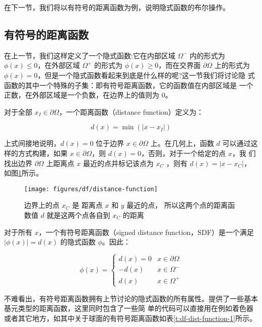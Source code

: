 在下一节，我们将以有符号的距离函数为例，说明隐式函数的布尔操作。



\subsection{有符号的距离函数}
在上一节，我们这样定义了一个隐式函数:它在内部区域 $\Omega^{−}$ 内的形式为 $\phi({x}) \leq 0$，在外部区域 $\Omega^{+}$ 的形式为 $\phi({x}) \geq 0$，而在交界面 $\partial\Omega$ 上的形式为 $\phi({x}) = 0$，但是一个隐式函数看起来到底是什么样的呢?这一节我们将讨论隐 式函数的其中一个特殊的子集：即有符号距离函数，它的函数值在内部区域是 一个正数，在外部区域是一个负数，在边界上的值则为 0。

对于全部 ${x}_I \in\partial\Omega$，一个距离函数（distance function）定义为：

\begin{equation}
	d({x})=\min (|{x}-{x}_I|)
\end{equation}

上式间接地说明，$d({x}) = 0$ 位于边界 ${x}\in\partial\Omega$ 上。在几何上，函数 $d$ 可以通过这样的方式构建，如果 ${x}\in \partial\Omega$，则 $d({x}) = 0$，否则，对于一个给定的点 ${x}$，我 们找出边界 $\partial\Omega$ 上距离点 ${x}$ 最近的点并标记该点为 ${x}_C$ ，则有 $d({x}) = |{x} − {x}_C |$， 如图\ref{f:df-distance-function}所示。

\begin{figure}
	\sidecaption
	\texttt{[image: figures/df/distance-function]}
	\caption{边界上的点 ${x}_C$ 是 距离点 ${x}$ 和 ${y}$ 最近的点， 所以这两个点的距离函数值 $d$ 就是这两个点各自到 ${x}_C$ 的距离}
	\label{f:df-distance-function}
\end{figure}

对于所有 ${x}$，一个有符号距离函数（signed distance function，SDF）是一个满足 $|\phi({x})| = d({x})$ 的隐式函数 $\phi$。因此：

\begin{equation}
	\phi({x})=\begin{cases}
		d({x})=0 & {x}\in\partial\Omega \\
		-d({x}) & {x}\in \Omega^{-} \\
		d({x}) & {x}\in \Omega^{+}
	\end{cases}
\end{equation}

不难看出，有符号距离函数拥有上节讨论的隐式函数的所有属性。\cite{w:distance-function}提供了一些基本基元类型的距离函数，这里同时包含了一些简 单的代码可以直接用在例如着色器或者其它地方，如其中关于球面的有符号距离函数如表\ref{t:df-dist-function-1}所示。


